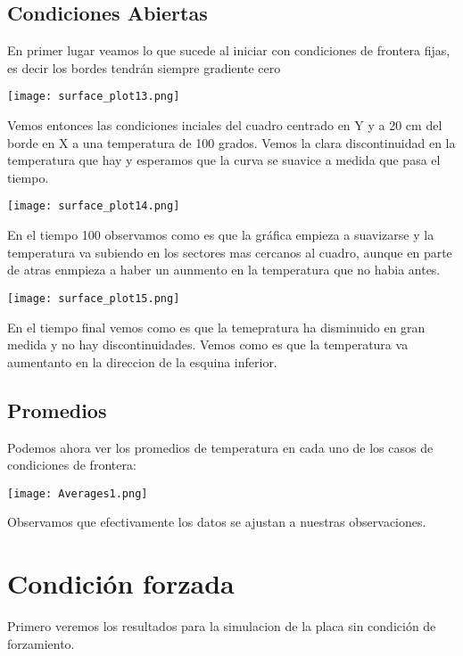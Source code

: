 \documentclass{article}
\begin{document}
\subsection{Condiciones Abiertas}
En primer lugar veamos lo que sucede al iniciar con condiciones de frontera fijas, es decir los bordes  tendr\'an siempre gradiente cero\\
\centerline{\texttt{[image: surface\_plot13.png]}}
Vemos entonces las condiciones inciales del cuadro centrado en Y y a 20 cm del borde en X a una temperatura de 100 grados. Vemos la clara discontinuidad en la temperatura que hay y esperamos que la curva se suavice a medida que pasa el tiempo.\\
\centerline{\texttt{[image: surface\_plot14.png]}}
En el tiempo 100 observamos como es que la gr\'afica empieza a suavizarse y la temperatura va subiendo en los sectores mas cercanos al cuadro, aunque en parte de atras enmpieza a haber un aunmento en la temperatura que no habia antes.
\centerline{\texttt{[image: surface\_plot15.png]}}
En el tiempo final vemos como es que la temepratura ha disminuido en gran medida y no hay discontinuidades. Vemos como es que la temperatura va aumentanto en la direccion de la esquina inferior.\\  
\subsection{Promedios}
Podemos ahora ver los promedios de temperatura en cada uno de los casos de condiciones de frontera:\\
\centerline{\texttt{[image: Averages1.png]}}
Observamos que efectivamente los datos se ajustan a nuestras observaciones.
\section{Condici\'on forzada}
Primero veremos los resultados para la simulacion de la placa sin condici\'on de forzamiento. 
\end{document}
